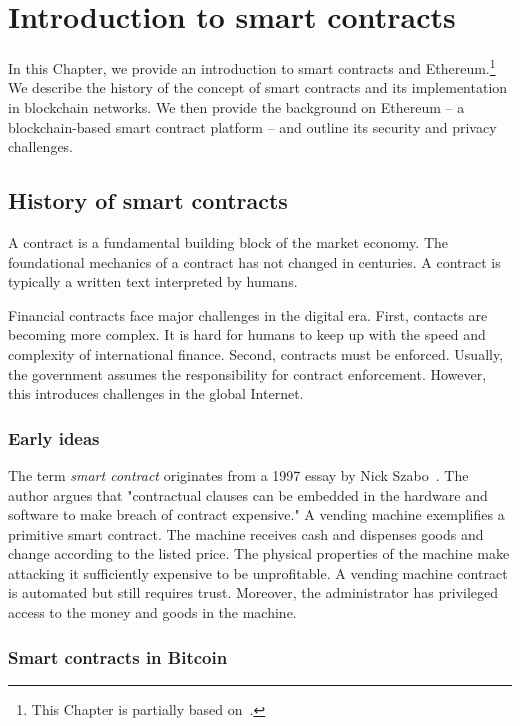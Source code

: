 \chapter{Introduction to smart contracts}

\label{Chapter09Introcontracts}

In this Chapter, we provide an introduction to smart contracts and Ethereum.\footnote{This Chapter is partially based on~\cite{Tikhomirov2017}.}
We describe the history of the concept of smart contracts and its implementation in blockchain networks.
We then provide the background on Ethereum -- a blockchain-based smart contract platform -- and outline its security and privacy challenges.

\section{History of smart contracts}

A contract is a fundamental building block of the market economy.
The foundational mechanics of a contract has not changed in centuries.
A contract is typically a written text interpreted by humans.

Financial contracts face major challenges in the digital era.
First, contacts are becoming more complex.
It is hard for humans to keep up with the speed and complexity of international finance.
Second, contracts must be enforced.
Usually, the government assumes the responsibility for contract enforcement.
However, this introduces challenges in the global Internet.


\subsection{Early ideas}

The term \textit{smart contract} originates from a 1997 essay by Nick Szabo~\cite{Szabo1997}.
The author argues that "contractual clauses \textelp{} can be embedded in the hardware and software \textelp{} to make breach of contract expensive."
A vending machine exemplifies a primitive smart contract.
The machine receives cash and dispenses goods and change according to the listed price.
The physical properties of the machine make attacking it sufficiently expensive to be unprofitable.
A vending machine contract is automated but still requires trust.
Moreover, the administrator has privileged access to the money and goods in the machine.


\subsection{Smart contracts in Bitcoin}

